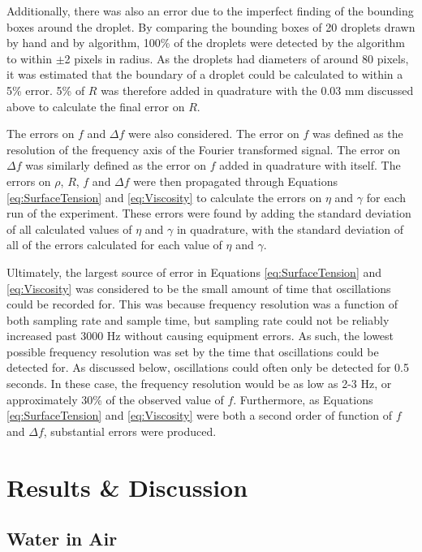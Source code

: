 \documentclass{physics_article_B}
\begin{document}
    Additionally, there was also an error due to the imperfect finding of the bounding boxes around the droplet. By comparing the bounding boxes of 20 droplets drawn by hand and by algorithm, 100\% of the droplets were detected by the algorithm to within $\pm$2 pixels in radius. As the droplets had diameters of around 80 pixels, it was estimated that the boundary of a droplet could be calculated to within a 5\% error. 5\% of $R$ was therefore added in quadrature with the 0.03 mm discussed above to calculate the final error on $R$. 
    
    The errors on $f$ and $\Delta f$ were also considered. The error on $f$ was defined as the resolution of the frequency axis of the Fourier transformed signal. The error on $\Delta f$ was similarly defined as the error on $f$ added in quadrature with itself. The errors on $\rho$, $R$, $f$ and $\Delta f$ were then propagated through Equations \ref{eq:SurfaceTension} and \ref{eq:Viscosity} to calculate the errors on $\eta$ and $\gamma$ for each run of the experiment. These errors were found by adding the standard deviation of all calculated values of $\eta$ and $\gamma$ in quadrature, with the standard deviation of all of the errors calculated for each value of $\eta$ and $\gamma$.
    
    Ultimately, the largest source of error in Equations \ref{eq:SurfaceTension} and \ref{eq:Viscosity} was considered to be the small amount of time that oscillations could be recorded for. This was because frequency resolution was a function of both sampling rate and sample time, but sampling rate could not be reliably increased past 3000 Hz without causing equipment errors. As such, the lowest possible frequency resolution was set by the time that oscillations could be detected for. As discussed below, oscillations could often only be detected for 0.5 seconds. In these case, the frequency resolution would be as low as 2-3 Hz, or approximately 30\% of the observed value of $f$. Furthermore, as Equations \ref{eq:SurfaceTension} and \ref{eq:Viscosity} were both a second order of function of $f$ and $\Delta f$, substantial errors were produced. 
    
\section{Results \& Discussion\label{sect:results}}

    \subsection{Water in Air\label{sect:results:WaterInAir}}
 	
\end{document}
